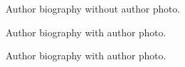 \documentclass[a4paper,fleqn]{cas-dc}
\begin{document}
%
%
%

\printcredits

%


%




\bio{}
Author biography without author photo.
\endbio

Author biography with author photo.
\endbio

Author biography with author photo.
\endbio
\end{document}
